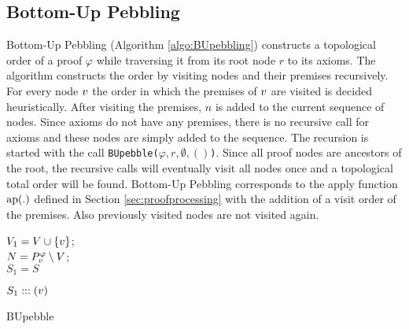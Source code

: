 \begin{example}
\label{example:TDPIssue}
\end{example}

\subsection{Bottom-Up Pebbling}

Bottom-Up Pebbling (Algorithm \ref{algo:BUpebbling}) constructs a topological order of a proof $\varphi$ while traversing it from its root node $r$ to its axioms. 
The algorithm constructs the order by visiting nodes and their premises recursively. 
For every node $v$ the order in which the premises of $v$ are visited is decided heuristically. 
After visiting the premises, $n$ is added to the current sequence of nodes.
Since axioms do not have any premises, there is no recursive call for axioms and these nodes are simply added to the sequence. 
The recursion is started with the call \texttt{BUpebble($\varphi,r,\emptyset,()$)}.
Since all proof nodes are ancestors of the root, the recursive calls will eventually visit all nodes once and a topological total order will be found.
Bottom-Up Pebbling corresponds to the apply function $\operatorname{ap}(.)$ defined in Section \ref{sec:proofprocessing} with the addition of a visit order of the premises.
Also previously visited nodes are not visited again.


%
%

\begin{algorithm}[h]
	
	$V_1 = V \cup \{v\}$; \\
	$N = P_{v}^{\varphi} \setminus V$;  \\
	$S_1 = S$\;
	
	
	\Return $S_1 ::: (v)$\;
	
  \caption{BUpebble}
	\label{algo:BUpebbling}
  
\end{algorithm}

